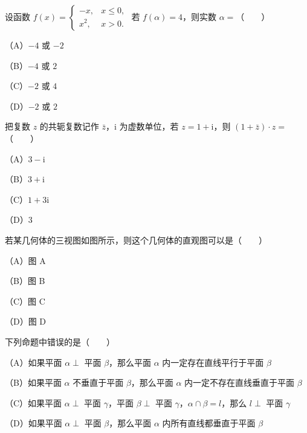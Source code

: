 

\begin{question}
设函数 $f(x)=\begin{cases}-x,&x\leqslant0,\\x^2,&x>0.\end{cases}$ 若 $f(\alpha)=4$，则实数 $\alpha=$\mbox{（　　）}

（A）$-4$ 或 $-2$

（B）$-4$ 或 $2$

（C）$-2$ 或 $4$

（D）$-2$ 或 $2$

\end{question}
\begin{question}
把复数 $z$ 的共轭复数记作 $\bar z$，$\mathrm i$ 为虚数单位，若 $z=1+\mathrm i$，则 $(1+\bar z)\cdot z=$\mbox{（　　）}

（A）$3-\mathrm i$

（B）$3+\mathrm i$

（C）$1+3\mathrm i$

（D）$3$

\Needspace{0.4\textheight}
\end{question}
\begin{question}
若某几何体的三视图如图所示，则这个几何体的直观图可以是\mbox{（　　）}

（A）图 A

（B）图 B

（C）图 C

（D）图 D
\nopagebreak[4]
\begin{center}\end{center}
\nopagebreak[4]
\end{question}
\begin{question}
下列命题中错误的是\mbox{（　　）}

（A）如果平面 $\alpha\perp$ 平面 $\beta$，那么平面 $\alpha$ 内一定存在直线平行于平面 $\beta$

（B）如果平面 $\alpha$ 不垂直于平面 $\beta$，那么平面 $\alpha$ 内一定不存在直线垂直于平面 $\beta$

（C）如果平面 $\alpha\perp$ 平面 $\gamma$，平面 $\beta\perp$ 平面 $\gamma$，$\alpha\cap\beta=l$，那么 $l\perp$ 平面 $\gamma$

（D）如果平面 $\alpha\perp$ 平面 $\beta$，那么平面 $\alpha$ 内所有直线都垂直于平面 $\beta$

\end{question}
